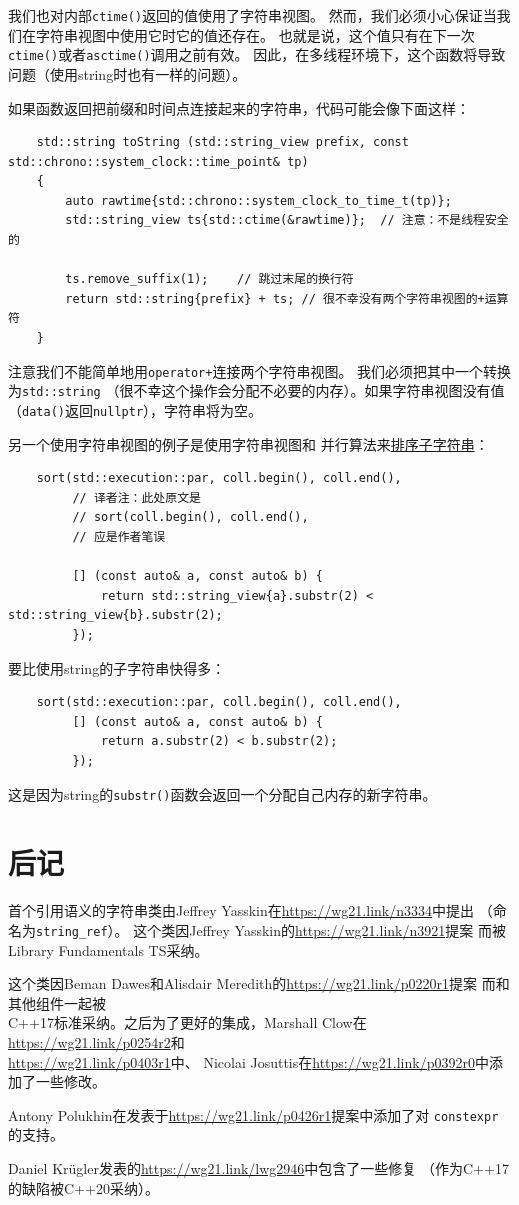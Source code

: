 我们也对内部\texttt{ctime()}返回的值使用了字符串视图。
然而，我们必须小心保证当我们在字符串视图中使用它时它的值还存在。
也就是说，这个值只有在下一次\texttt{ctime()}或者\texttt{asctime()}调用之前有效。
因此，在多线程环境下，这个函数将导致问题（使用string时也有一样的问题）。

如果函数返回把前缀和时间点连接起来的字符串，代码可能会像下面这样：
\begin{lstlisting}
    std::string toString (std::string_view prefix, const std::chrono::system_clock::time_point& tp)
    {
        auto rawtime{std::chrono::system_clock_to_time_t(tp)};
        std::string_view ts{std::ctime(&rawtime)};  // 注意：不是线程安全的

        ts.remove_suffix(1);    // 跳过末尾的换行符
        return std::string{prefix} + ts; // 很不幸没有两个字符串视图的+运算符
    }
\end{lstlisting}
注意我们不能简单地用\texttt{operator+}连接两个字符串视图。
我们必须把其中一个转换为\texttt{std::string}
（很不幸这个操作会分配不必要的内存）。如果字符串视图没有值
（\texttt{data()}返回\texttt{nullptr}），字符串将为空。

另一个使用字符串视图的例子是使用字符串视图和
并行算法来\hyperref[{ch22.1.2.1}]{排序子字符串}：
\begin{lstlisting}
    sort(std::execution::par, coll.begin(), coll.end(),
         // 译者注：此处原文是
         // sort(coll.begin(), coll.end(),
         // 应是作者笔误

         [] (const auto& a, const auto& b) {
             return std::string_view{a}.substr(2) < std::string_view{b}.substr(2);
         });
\end{lstlisting}
要比使用string的子字符串快得多：
\begin{lstlisting}
    sort(std::execution::par, coll.begin(), coll.end(),
         [] (const auto& a, const auto& b) {
             return a.substr(2) < b.substr(2);
         });
\end{lstlisting}
这是因为string的\texttt{substr()}函数会返回一个分配自己内存的新字符串。


\section{后记}
首个引用语义的字符串类由Jeffrey Yasskin在\url{https://wg21.link/n3334}中提出
（命名为\texttt{string\_ref}）。
这个类因Jeffrey Yasskin的\url{https://wg21.link/n3921}提案
而被Library Fundamentals TS采纳。

这个类因Beman Dawes和Alisdair Meredith的\url{https://wg21.link/p0220r1}提案
而和其他组件一起被\\
C++17标准采纳。之后为了更好的集成，Marshall Clow在\url{https://wg21.link/p0254r2}和\\
\url{https://wg21.link/p0403r1}中、
Nicolai Josuttis在\url{https://wg21.link/p0392r0}中添加了一些修改。

Antony Polukhin在发表于\url{https://wg21.link/p0426r1}提案中添加了对
\texttt{constexpr}的支持。

Daniel Krügler发表的\url{https://wg21.link/lwg2946}中包含了一些修复
（作为C++17的缺陷被C++20采纳）。
